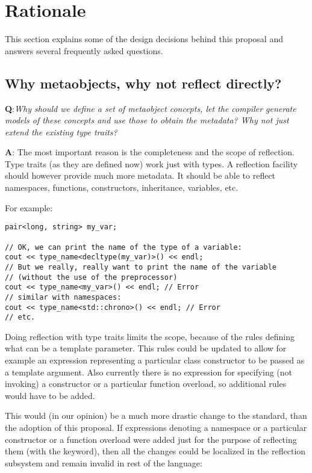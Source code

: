 \section{Rationale}

This section explains some of the design decisions behind this proposal and
answers several frequently asked questions.

\subsection{Why metaobjects, why not reflect directly?}

{\textbf Q:}{\em Why should we define a set of metaobject concepts, let the compiler generate
models of these concepts and use those to obtain the metadata? Why not just extend the existing
type traits?}

{\textbf A:} The most important reason is the completeness and the scope of reflection.
Type traits (as they are defined now) work just with types. A reflection facility should
however provide much more metadata.
It should be able to reflect namespaces, functions, constructors, inheritance, variables, etc.

For example:

\begin{verbatim}
pair<long, string> my_var;

// OK, we can print the name of the type of a variable:
cout << type_name<decltype(my_var)>() << endl;
// But we really, really want to print the name of the variable
// (without the use of the preprocessor)
cout << type_name<my_var>() << endl; // Error
// similar with namespaces:
cout << type_name<std::chrono>() << endl; // Error
// etc.
\end{verbatim}


Doing reflection with type traits limits the scope, because of the rules defining what
can be a template parameter. This rules could be updated to allow for example an expression
representing a particular class constructor to  be passed as a template argument.
Also currently there is no expression for specifying (not invoking) a constructor
or a particular function overload, so additional rules would have to be added.

This would (in our opinion) be a much more drastic change to the standard, than
the adoption of this proposal. If expressions denoting a namespace or a particular
constructor or a function overload were added just for the purpose of reflecting
them (with the \verb@mirroed@ keyword), then all the changes could be localized
in the reflection subsystem and remain invalid in rest of the language:

